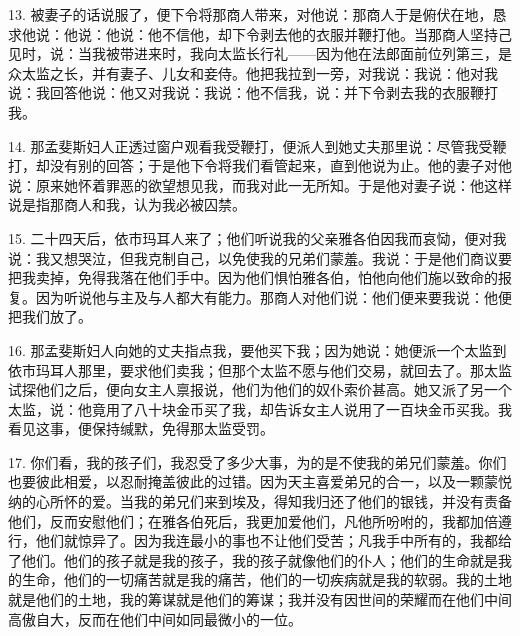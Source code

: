 13. 被妻子的话说服了，便下令将那商人带来，对他说：那商人于是俯伏在地，恳求他说：他说：他说：他不信他，却下令剥去他的衣服并鞭打他。当那商人坚持己见时，说：当我被带进来时，我向太监长行礼——因为他在法郎面前位列第三，是众太监之长，并有妻子、儿女和妾侍。他把我拉到一旁，对我说：我说：他对我说：我回答他说：他又对我说：我说：他不信我，说：并下令剥去我的衣服鞭打我。\par

14. 那孟斐斯妇人正透过窗户观看我受鞭打，便派人到她丈夫那里说：尽管我受鞭打，却没有别的回答；于是他下令将我们看管起来，直到他说为止。他的妻子对他说：原来她怀着罪恶的欲望想见我，而我对此一无所知。于是他对妻子说：他这样说是指那商人和我，认为我必被囚禁。\par

15. 二十四天后，依市玛耳人来了；他们听说我的父亲雅各伯因我而哀恸，便对我说：我又想哭泣，但我克制自己，以免使我的兄弟们蒙羞。我说：于是他们商议要把我卖掉，免得我落在他们手中。因为他们惧怕雅各伯，怕他向他们施以致命的报复。因为听说他与主及与人都大有能力。那商人对他们说：他们便来要我说：他便把我们放了。\par

16. 那孟斐斯妇人向她的丈夫指点我，要他买下我；因为她说：她便派一个太监到依市玛耳人那里，要求他们卖我；但那个太监不愿与他们交易，就回去了。那太监试探他们之后，便向女主人禀报说，他们为他们的奴仆索价甚高。她又派了另一个太监，说：他竟用了八十块金币买了我，却告诉女主人说用了一百块金币买我。我看见这事，便保持缄默，免得那太监受罚。\par

17. 你们看，我的孩子们，我忍受了多少大事，为的是不使我的弟兄们蒙羞。你们也要彼此相爱，以忍耐掩盖彼此的过错。因为天主喜爱弟兄的合一，以及一颗蒙悦纳的心所怀的爱。当我的弟兄们来到埃及，得知我归还了他们的银钱，并没有责备他们，反而安慰他们；在雅各伯死后，我更加爱他们，凡他所吩咐的，我都加倍遵行，他们就惊异了。因为我连最小的事也不让他们受苦；凡我手中所有的，我都给了他们。他们的孩子就是我的孩子，我的孩子就像他们的仆人；他们的生命就是我的生命，他们的一切痛苦就是我的痛苦，他们的一切疾病就是我的软弱。我的土地就是他们的土地，我的筹谋就是他们的筹谋；我并没有因世间的荣耀而在他们中间高傲自大，反而在他们中间如同最微小的一位。\par

